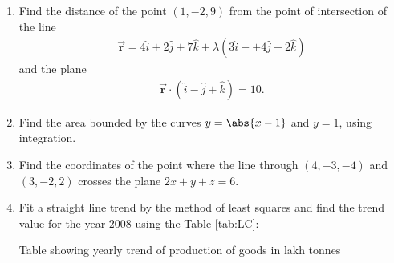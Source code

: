 %
\begin{enumerate}
	\item Find the distance of the point $(1,-2,9)$ from the point of intersection of the line 
		\begin{align}
			\overrightarrow{\textbf{r}}=4\hat{i}+2\hat{j}+7\hat{k}+\lambda(3\hat{i}-+4\hat{j}+2\hat{k})
		\end{align}and the plane 
		\begin{align}
			\overrightarrow{\textbf{r}}\cdot(\hat{i}-\hat{j}+\hat{k})=10.
		\end{align}
	\item Find the area bounded by the curves $y=\abs{x-1}$ and $y=1$, using integration.
\item Find the coordinates of the point where the line through $(4,-3,-4)$ and $(3,-2,2)$ crosses the plane $2x+y+z=6$.
\item Fit a straight line trend by the method of least squares and find the trend value for the year 2008 using the Table \ref{tab:LC}:
	\begin{table}[H]
		\caption{Table showing yearly trend of production of goods in lakh tonnes \label{tab:LC}}
		
	\end{table}
\end{enumerate}
%
